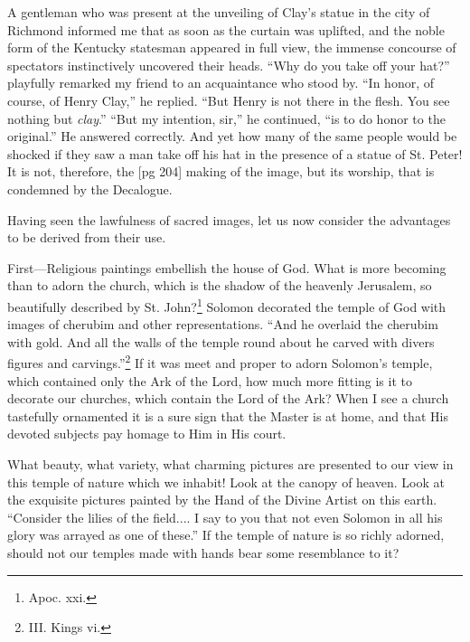A gentleman who was present at the unveiling
of Clay's statue in the city of Richmond informed
me that as soon as the curtain was uplifted, and
the noble form of the Kentucky statesman appeared
in full view, the immense concourse of
spectators instinctively uncovered their heads.
“Why do you take off your hat?” playfully remarked
my friend to an acquaintance who stood
by. “In honor, of course, of Henry Clay,” he
replied. “But Henry is not there in the flesh.
You see nothing but \emph{clay}.” “But my intention,
sir,” he continued, “is to do honor to the original.”
He answered correctly. And yet how
many of the same people would be shocked if
they saw a man take off his hat in the presence of
a statue of St. Peter! It is not, therefore, the
[pg 204]
making of the image, but its worship, that is condemned
by the Decalogue.

Having seen the lawfulness of sacred images,
let us now consider the advantages to be derived
from their use.

First—Religious paintings embellish the house
of God. What is more becoming than to adorn
the church, which is the shadow of the heavenly
Jerusalem, so beautifully described by St. John?\footnote{Apoc. xxi.}
Solomon decorated the temple of God with
images of cherubim and other representations.
“And he overlaid the cherubim with gold. And
all the walls of the temple round about he carved
with divers figures and carvings.”\footnote{III. Kings vi.} If it was
meet and proper to adorn Solomon's temple,
which contained only the Ark of the Lord, how
much more fitting is it to decorate our churches,
which contain the Lord of the Ark? When I see
a church tastefully ornamented it is a sure sign
that the Master is at home, and that His devoted
subjects pay homage to Him in His court.

What beauty, what variety, what charming pictures
are presented to our view in this temple of
nature which we inhabit! Look at the canopy of
heaven. Look at the exquisite pictures painted
by the Hand of the Divine Artist on this earth.
“Consider the lilies of the field.... I say to you
that not even Solomon in all his glory was arrayed
as one of these.” If the temple of nature
is so richly adorned, should not our temples made
with hands bear some resemblance to it?

